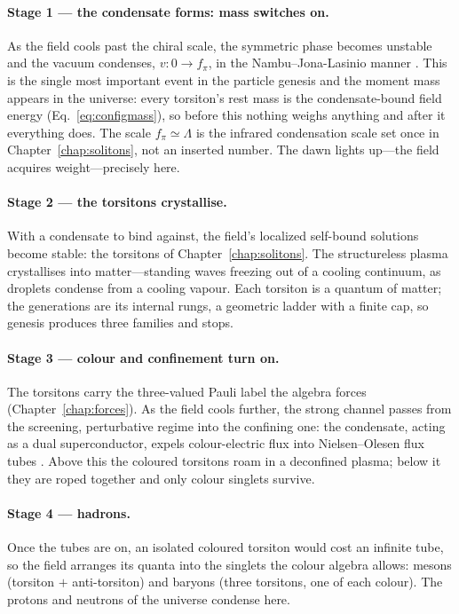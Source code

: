 \paragraph{Stage 1 --- the condensate forms: mass switches on.}
As the field cools past the chiral scale, the symmetric phase becomes unstable and the vacuum
condenses, $v:0\to f_\pi$, in the Nambu--Jona-Lasinio manner \citep{nambu1961}. This is the
single most important event in the particle genesis and the moment mass appears in the universe:
every torsiton's rest mass is the condensate-bound field energy
(Eq.~\ref{eq:configmass}), so before this nothing weighs anything and after it everything does.
The scale $f_\pi\simeq\Lambda$ is the infrared condensation scale set once in
Chapter~\ref{chap:solitons}, not an inserted number. The dawn lights up---the field acquires
weight---precisely here.

\paragraph{Stage 2 --- the torsitons crystallise.}
With a condensate to bind against, the field's localized self-bound solutions become stable:
the torsitons of Chapter~\ref{chap:solitons}. The structureless plasma crystallises into
matter---standing waves freezing out of a cooling continuum, as droplets condense from a
cooling vapour. Each torsiton is a quantum of matter; the generations are its internal rungs,
a geometric ladder with a finite cap, so genesis produces three families and stops.

\paragraph{Stage 3 --- colour and confinement turn on.}
The torsitons carry the three-valued Pauli label the algebra forces
(Chapter~\ref{chap:forces}). As the field cools further, the strong channel passes from the
screening, perturbative regime into the confining one: the condensate, acting as a dual
superconductor, expels colour-electric flux into Nielsen--Olesen flux tubes
\citep{nielsen1973}. Above this the coloured torsitons roam in a deconfined plasma; below it
they are roped together and only colour singlets survive.

\paragraph{Stage 4 --- hadrons.}
Once the tubes are on, an isolated coloured torsiton would cost an infinite tube, so the field
arranges its quanta into the singlets the colour algebra allows: mesons (torsiton $+$
anti-torsiton) and baryons (three torsitons, one of each colour). The protons and neutrons of
the universe condense here.

